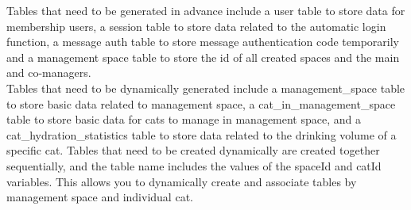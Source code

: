 \documentclass[conference]{IEEEtran}
\begin{document}
Tables that need to be generated in advance include a user
table to store data for membership users, a session table
to store data related to the automatic login function, a message auth table to store message authentication code temporarily and a management space table to store the id of all created spaces and the main and co-managers. \\

Tables that need to be dynamically generated include a management\_space table to store basic data related to management space, a cat\_in\_management\_space table to store basic data for cats to manage in management space, and a cat\_hydration\_statistics table to store data related to the drinking volume of a specific cat. Tables that need to be created dynamically are created together sequentially, and the table name includes the values of the spaceId and catId variables. This allows you to dynamically create and associate tables by management space and individual cat.\\
\end{document}
